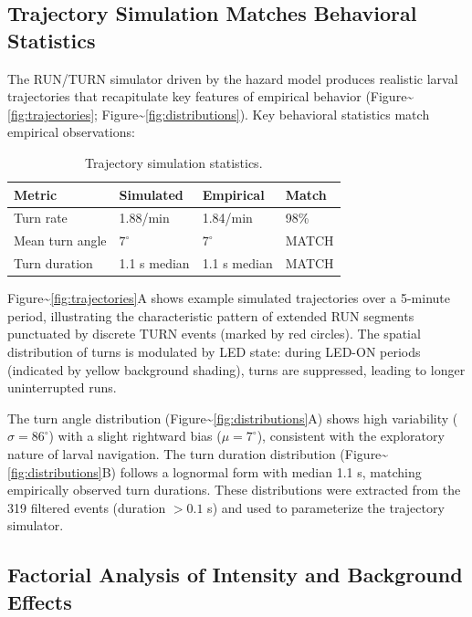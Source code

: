 \documentclass[
  11pt,
  letterpaper,
]{article}
\begin{document}
\subsection{Trajectory Simulation Matches Behavioral Statistics}

The RUN/TURN simulator driven by the hazard model produces realistic
larval trajectories that recapitulate key features of empirical behavior
(Figure\textasciitilde{}\ref{fig:trajectories};
Figure\textasciitilde{}\ref{fig:distributions}). Key behavioral
statistics match empirical observations:

\begin{table}[h]
\centering
\caption{Trajectory simulation statistics.}
\label{tab:trajectory}
\begin{tabular}{llll}
\hline
\textbf{Metric} & \textbf{Simulated} & \textbf{Empirical} & \textbf{Match} \\
\hline
Turn rate & 1.88/min & 1.84/min & 98\% \\
Mean turn angle & $7^\circ$ & $7^\circ$ & MATCH \\
Turn duration & 1.1 s median & 1.1 s median & MATCH \\
\hline
\end{tabular}
\end{table}

Figure\textasciitilde{}\ref{fig:trajectories}A shows example simulated
trajectories over a 5-minute period, illustrating the characteristic
pattern of extended RUN segments punctuated by discrete TURN events
(marked by red circles). The spatial distribution of turns is modulated
by LED state: during LED-ON periods (indicated by yellow background
shading), turns are suppressed, leading to longer uninterrupted runs.

The turn angle distribution
(Figure\textasciitilde{}\ref{fig:distributions}A) shows high variability
(\(\sigma = 86^\circ\)) with a slight rightward bias
(\(\mu = 7^\circ\)), consistent with the exploratory nature of larval
navigation. The turn duration distribution
(Figure\textasciitilde{}\ref{fig:distributions}B) follows a lognormal
form with median 1.1 s, matching empirically observed turn durations.
These distributions were extracted from the 319 filtered events
(duration \(> 0.1\) s) and used to parameterize the trajectory
simulator.

\subsection{Factorial Analysis of Intensity and Background Effects}
\label{sec:factorial}
\end{document}
